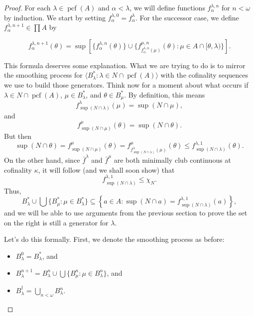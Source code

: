 \documentclass[10pt]{amsart}
\theoremstyle{plain}
\theoremstyle{definition}
\theoremstyle{remark}
\DeclareMathOperator{\pcf}{pcf}
\numberwithin{equation}{section}
\begin{document}
\begin{proof}


For each $\lambda\in\pcf(A)$ and $\alpha<\lambda$, we will define functions $f^{\lambda,n}_\alpha$ for $n<\omega$ by induction.
We start by setting $f^{\lambda,0}_\alpha = f^\lambda_\alpha$.  For the successor case, we define $f^{\lambda,
n+1}_\alpha\in\prod A$ by

\begin{equation}
\label{eqn:7.4}
f^{\lambda, n+1}_\alpha(\theta)=\sup\left[\{f^{\lambda,n}_\alpha(\theta)\}\cup\{f^{\mu,n}_{f^{\lambda,n}_\alpha(\mu)}(\theta):\mu\in
A\cap [\theta,\lambda)\}\right].
\end{equation}

This formula deserves some explanation. What we are trying to do is to mirror the smoothing process for $\langle
B^*_\lambda:\lambda\in N\cap\pcf(A)\rangle$ with the cofinality sequences we use to build those generators.  Think now for a
moment about what occurs if $\lambda\in N\cap\pcf(A)$, $\mu\in B^*_\lambda$, and $\theta\in B^*_\mu$.  By definition, this means
\begin{equation}
f^\lambda_{\sup(N\cap\lambda)}(\mu) = \sup(N\cap\mu),
\end{equation}
and
\begin{equation}
f^\mu_{\sup(N\cap\mu)}(\theta) = \sup(N\cap\theta).
\end{equation}
But then
\begin{equation}
\sup(N\cap\theta)=f^\mu_{\sup(N\cap\mu)}(\theta) = f^\mu_{f^\lambda_{\sup(N\cap\lambda)}(\mu)}(\theta)\leq f^{\lambda, 1}_{\sup(N\cap\lambda)}(\theta).
\end{equation}
On the other hand, since $\bar{f}^\lambda$ and $\bar{f}^\mu$ are both minimally club continuous at cofinality $\kappa$, it will follow
(and we shall soon show) that
\begin{equation}
f^{\lambda, 1}_{\sup(N\cap\lambda)}\leq \chi_N.
\end{equation}
Thus,
\begin{equation}
 B^*_\lambda\cup\bigcup\{B^*_\mu:\mu\in B^*_\lambda\}\subseteq \left\{a\in A: \sup(N\cap a) = f^{\lambda, 1}_{\sup(N\cap\lambda)}(a)\right\},
\end{equation}
and we will be able to use arguments from the previous section to prove the set on the right is still a generator for $\lambda$.

Let's do this formally. First, we denote the smoothing process as before:
\begin{itemize}
\item $B^0_\lambda = B^*_\lambda$, and
\item $B^{n+1}_\lambda = B^n_\lambda\cup\bigcup\{B^n_\mu:\mu\in B^n_\lambda\}$, and
\item $B^\dagger_\lambda = \bigcup_{n<\omega} B^n_\lambda$.
\end{itemize}




\end{proof}
\end{document}
